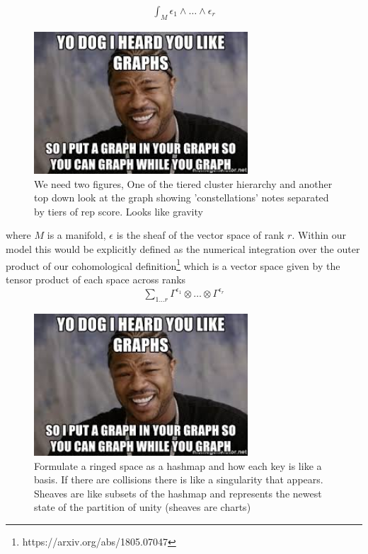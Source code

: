 \documentclass{article}
\begin{document}
\begin{equation*} \label{eq1}
\begin{split}
\int_M \epsilon_1 \wedge \dots \wedge \epsilon_r
\end{split}
\end{equation*}

\begin{figure}[h]
\caption{We need two figures, One of the tiered cluster hierarchy and another top down look at the graph showing 'constellations' notes separated by tiers of rep score. Looks like gravity}
\includegraphics[width=8cm]{yo_dawg}
\centering
\end{figure}

where $M$ is a manifold, $\epsilon$ is the sheaf of the vector space of rank $r$. Within our model this would be explicitly defined as the numerical integration over the outer product of our cohomological definition\footnote{https://arxiv.org/abs/1805.07047} which is a vector space given by the tensor product of each space across ranks
\begin{equation*} \label{eq1}
\begin{split}
\sum_{1 \dots r} \Gamma^{\epsilon_1} \otimes \dots \otimes \Gamma^{\epsilon_r}
\end{split}
\end{equation*}

\begin{figure}[h]
\caption{Formulate a ringed space as a hashmap and how each key is like a basis. If there are collisions there is like a singularity that appears. Sheaves are like subsets of the hashmap and represents the newest state of the partition of unity (sheaves are charts)}
\includegraphics[width=8cm]{yo_dawg}
\centering
\end{figure}
\end{document}
